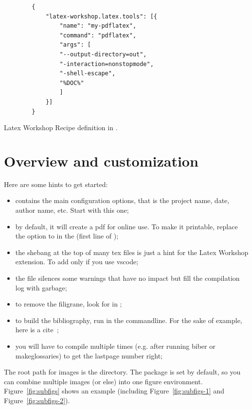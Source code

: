 \begin{listing}[ht]
    \begin{verbatim}
        {    
            "latex-workshop.latex.tools": [{
                "name": "my-pdflatex",
                "command": "pdflatex",
                "args": [
                "--output-directory=out",
                "-interaction=nonstopmode",
                "-shell-escape",
                "%DOC%"
                ]
            }]
        }
    \end{verbatim}
    \caption{Latex Workshop Recipe definition in .}
    \label{lst:latex-recipe}
\end{listing}

\section{Overview and customization}

Here are some hints to get started:

\begin{itemize}
    \item {} contains the main configuration options, that is the project name, date, author name, etc. Start with this one;
    \item by default, it will create a pdf for online use. To make it printable, replace the option  to  in the  (first line of );
    \item the shebang  at the top of many tex files is just a hint for the Latex Workshop extension. To add only if you use vscode;
    \item the file  silences some warnings that have no impact but fill the compilation log with garbage;
    \item to remove the filigrane, look for  in ;
    \item to build the bibliography, run  in the commandline. For the sake of example, here is a cite~\cite{bapst2019pattern};
    \item you will have to compile multiple times (e.g. after running biber or makeglossaries) to get the lastpage number right;
\end{itemize}

The root path for images is the  directory. The  package is set by default, so you can combine multiple images (or else) into one figure environment. Figure~\ref{fig:subfigs} shows an example (including Figure~\ref{fig:subfigs-1} and Figure~\ref{fig:subfigs-2}).

